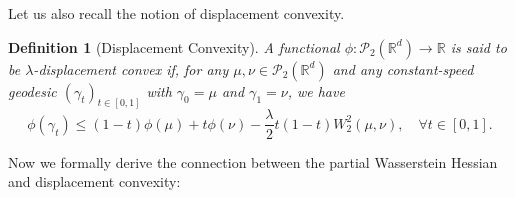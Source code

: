\documentclass[11pt,a4paper]{amsart}
\newcommand{\1}{\mathds{1}}
\newtheorem{definition}[theorem]{\textbf{Definition}}
\numberwithin{equation}{section}
\begin{document}
Let us also recall the notion of displacement convexity.

\begin{definition}[Displacement Convexity] \label{geodesic_convex}
A functional $\phi : \mathcal{P}_2(\mathbb{R}^d) \to \mathbb{R}$ is said to be $\lambda$-\textnormal{displacement convex} if, for any $\mu, \nu \in \mathcal{P}_2(\mathbb{R}^d)$ and any \textnormal{constant-speed geodesic} $(\gamma_t)_{t \in [0,1]}$ with $\gamma_0 = \mu$ and $\gamma_1 = \nu$, we have
\[
\phi(\gamma_t) \leq (1 - t) \phi(\mu) + t \phi(\nu) - \frac{\lambda}{2} t(1 - t) W_2^2(\mu, \nu), \quad \forall t \in [0,1].
\]
\end{definition}

Now we formally derive the connection between the partial Wasserstein Hessian and displacement convexity:
\end{document}
